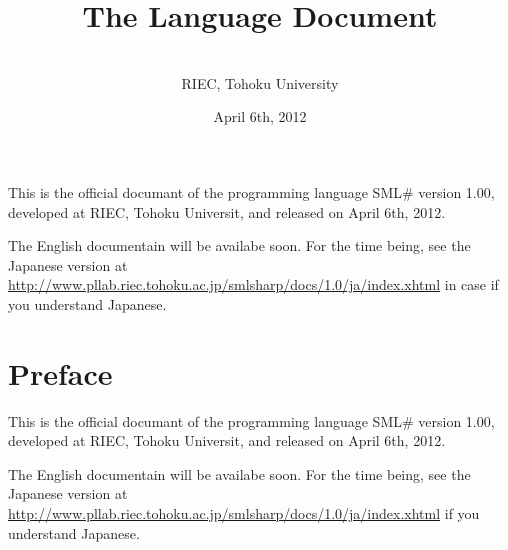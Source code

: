 \documentclass{book}
\date{April 6th, 2012}
\title{The \smlsharp{} Language Document}
\author{
\authors
\\
RIEC, Tohoku University
}
\newcommand{\smlsharp}{SML\#}
\newcommand{\version}{1.00}
\begin{document}
\maketitle

\tableofcontents

	This is the official documant of the programming language 
\smlsharp{} version \version, developed at RIEC, Tohoku Universit,
and released on April 6th, 2012.

\bigskip

\begin{Large}
The English documentain will be availabe soon. For the time being, see the Japanese version at 
\url{http://www.pllab.riec.tohoku.ac.jp/smlsharp/docs/1.0/ja/index.xhtml}
in case if you understand Japanese.
\end{Large}

\chapter*{Preface}

	This is the official documant of the programming language 
\smlsharp{} version \version, developed at RIEC, Tohoku Universit,
and released on April 6th, 2012.

\bigskip

\begin{Large}
The English documentain will be availabe soon. For the time being, see the Japanese version at 
\url{http://www.pllab.riec.tohoku.ac.jp/smlsharp/docs/1.0/ja/index.xhtml}
if you understand Japanese.
\end{Large}
\end{document}
